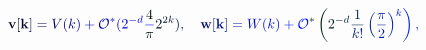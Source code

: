 \documentclass[12pt]{article}
\begin{document}
\makeatletter
\renewcommand*{\@textcolor}[3]{%
  \protect\leavevmode
  \begingroup
    \color#1{#2}#3%
  \endgroup
}
\makeatother
\begin{displaymath}
\mathbf { \mathcolor[RGB]{0,0,15}{v} } \mathcolor[RGB]{0,0,30}{[} \mathbf { \mathcolor[RGB]{0,0,45}{k} } \mathcolor[RGB]{0,0,60}{]} \mathcolor[RGB]{0,0,75}{=} \mathcolor[RGB]{0,0,90}{V} \mathcolor[RGB]{0,0,105}{(} \mathcolor[RGB]{0,0,120}{k} \mathcolor[RGB]{0,0,135}{)} \mathcolor[RGB]{0,0,150}{+} \mathbf { \mathcal { \mathcolor[RGB]{0,0,165}{O} } } ^ { \mathcolor[RGB]{0,0,180}{*} } \mathcolor[RGB]{0,0,195}{(} \mathcolor[RGB]{0,0,210}{2} ^ { \mathcolor[RGB]{0,0,225}{-} \mathcolor[RGB]{0,0,240}{d} } \mathcolor[RGB]{0,0,255}{\frac { \mathcolor[RGB]{0,15,0}{4} } { \mathcolor[RGB]{0,15,15}{\pi} } } \mathcolor[RGB]{0,15,30}{2} ^ { \mathcolor[RGB]{0,15,45}{2} \mathcolor[RGB]{0,15,60}{k} } \mathcolor[RGB]{0,15,75}{)} \mathcolor[RGB]{0,15,90}{,} \quad \mathbf { \mathcolor[RGB]{0,15,105}{w} } \mathcolor[RGB]{0,15,120}{[} \mathbf { \mathcolor[RGB]{0,15,135}{k} } \mathcolor[RGB]{0,15,150}{]} \mathcolor[RGB]{0,15,165}{=} \mathcolor[RGB]{0,15,180}{W} \mathcolor[RGB]{0,15,195}{(} \mathcolor[RGB]{0,15,210}{k} \mathcolor[RGB]{0,15,225}{)} \mathcolor[RGB]{0,15,240}{+} \mathbf { \mathcal { \mathcolor[RGB]{0,15,255}{O} } } ^ { \mathcolor[RGB]{0,30,0}{*} } \mathcolor[RGB]{0,30,15}{\left(} \mathcolor[RGB]{0,30,30}{2} ^ { \mathcolor[RGB]{0,30,45}{-} \mathcolor[RGB]{0,30,60}{d} } \mathcolor[RGB]{0,30,75}{\frac { \mathcolor[RGB]{0,30,90}{1} } { \mathcolor[RGB]{0,30,105}{k} \mathcolor[RGB]{0,30,120}{!} } } \mathcolor[RGB]{0,30,135}{\left(} \mathcolor[RGB]{0,30,150}{\frac { \mathcolor[RGB]{0,30,165}{\pi} } { \mathcolor[RGB]{0,30,180}{2} } } \mathcolor[RGB]{0,30,195}{\right)} ^ { \mathcolor[RGB]{0,30,210}{k} } \mathcolor[RGB]{0,30,225}{\right)} \mathcolor[RGB]{0,30,240}{,}
\end{displaymath}
\end{document}
